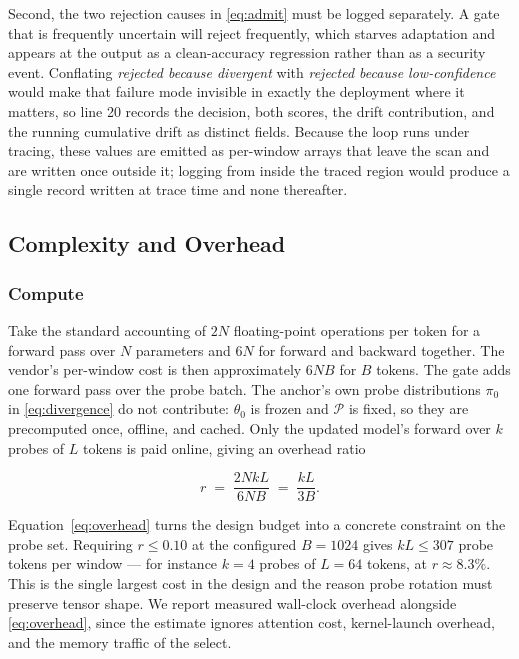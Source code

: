 \documentclass[journal]{IEEEtran}
\newcommand{\anchorp}{\theta_{0}}
\begin{document}
Second, the two rejection causes in \eqref{eq:admit} must be logged separately. A
gate that is frequently uncertain will reject frequently, which starves adaptation
and appears at the output as a clean-accuracy regression rather than as a security
event. Conflating \emph{rejected because divergent} with \emph{rejected because
low-confidence} would make that failure mode invisible in exactly the deployment
where it matters, so line 20 records the decision, both scores, the drift
contribution, and the running cumulative drift as distinct fields. Because the loop
runs under tracing, these values are emitted as per-window arrays that leave the scan
and are written once outside it; logging from inside the traced region would produce
a single record written at trace time and none thereafter.

\subsection{Complexity and Overhead}
\label{sec:complexity}

\subsubsection{Compute}
Take the standard accounting of $2N$ floating-point operations per token for a
forward pass over $N$ parameters and $6N$ for forward and backward together. The
vendor's per-window cost is then approximately $6NB$ for $B$ tokens. The gate adds
one forward pass over the probe batch. The anchor's own probe distributions
$\pi_{0}$ in \eqref{eq:divergence} do not contribute: $\anchorp$ is frozen and
$\mathcal{P}$ is fixed, so they are precomputed once, offline, and cached. Only the
updated model's forward over $k$ probes of $L$ tokens is paid online, giving an
overhead ratio

\begin{equation}
r \;=\; \frac{2 N k L}{6 N B} \;=\; \frac{kL}{3B}.
\label{eq:overhead}
\end{equation}

Equation~\eqref{eq:overhead} turns the design budget into a concrete constraint on
the probe set. Requiring $r \leq 0.10$ at the configured $B = 1024$ gives
$kL \leq 307$ probe tokens per window --- for instance $k = 4$ probes of $L = 64$
tokens, at $r \approx 8.3\%$. This is the single largest cost in the design and the
reason probe rotation must preserve tensor shape. We report measured wall-clock
overhead alongside \eqref{eq:overhead}, since the estimate ignores attention cost,
kernel-launch overhead, and the memory traffic of the select.
\end{document}
